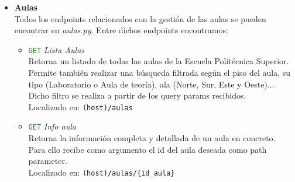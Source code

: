 \documentclass[12pt]{report}
\begin{document}
\begin{itemize}
\begin{itemize}
        \item \textcolor{ForestGreen}{\texttt{GET}} \textit{Obtener taquilla reservada}\\
        Este endpoint devuelve el ID de la taquilla reservada por un alumno específico.\\
        Recibe como parámetro el \texttt{id\_alumno} del alumno.\\
        Localizado en: \texttt{(host)/taquilla/Alumno/\{id\_alumno\}}
        \item \textcolor{YellowOrange}{\texttt{POST}} \textit{Abrir taquilla}\\
        Este endpoint permite abrir una taquilla a partir de su ID y una contraseña.\\
        Recibe como parámetro el \texttt{id\_taquilla} de la taquilla deseada y la contraseña en el cuerpo de la solicitud.\\
        Localizado en: \texttt{(host)/taquillas/\{id\_taquilla\}}\\
        Ejemplo de cuerpo de la solicitud:
        \begin{verbatim}
        {
          "password": "contraseña"
        }
        \end{verbatim}
        
    \end{itemize}
    \item \textbf{Aulas}\\
    Todos los endpoints relacionados con la gestión de las aulas se pueden encontrar en \textit{aulas.py}. Entre dichos endpoints encontramos:
    \begin{itemize}
        \item \textcolor{ForestGreen}{\texttt{GET}} \textit{Lista Aulas}\\
        Retorna un listado de todas las aulas de la Escuela Politécnica Superior. Permite también realizar una búsqueda filtrada según el piso del aula, su tipo (Laboratorio o Aula de teoría), ala (Norte, Sur, Este y Oeste)... Dicho filtro se realiza a partir de los query params recibidos.\\
        Localizado en: \texttt{(host)/aulas}
    
        \item \textcolor{ForestGreen}{\texttt{GET}} \textit{Info aula}\\
        Retorna la información completa y detallada de un aula en concreto.\\
        Para ello recibe como argumento el id del aula deseada como path parameter.\\
        Localizado en: \texttt{(host)/aulas/\{id\_aula\}}
        

\end{itemize}
\end{itemize}
\end{document}
